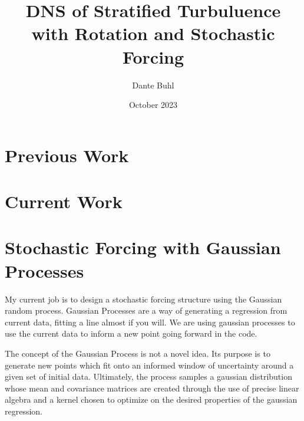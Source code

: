 \documentclass{article}
\title{DNS of Stratified Turbuluence with Rotation and Stochastic Forcing}
\author{Dante Buhl}
\date{October 2023}
\begin{document}
\newcommand{\bs}[1]{\boldsymbol{#1}}
\newcommand{\bmp}[1]{\begin{minipage}{#1\textwidth}}
\newcommand{\emp}{\end{minipage}}
\newcommand{\R}{\mathbb{R}}
\newcommand{\N}{\mathcal{N}}
\newcommand{\K}{\bs{\mathrm{K}}}
\newcommand{\m}{\bs{\mu}_*}
\newcommand{\s}{\bs{\Sigma}_*}
\newcommand{\dt}{\Delta t}

\maketitle

\section{Previous Work}


\section{Current Work}


\section{Stochastic Forcing with Gaussian Processes}
\begin{comment}
 \left[\begin{array}{c c c c c}
    0 & \cdots & 0& \cdots& 0 \\
    \vdots & 0 & 0 & \cdots & 0 \\
    0 & 0 & \lambda_{n_c} & 0 & \vdots \\
    \vdots & \vdots & 0 & \ddots & 0 \\
    0 & 0 & \cdots & 0 & \lambda_{n}
    \end{array}\right]    
\end{comment}

My current job is to design a stochastic forcing structure using the Gaussian random process. Gaussian Processes are a way of generating a regression from current data, fitting a line almost if you will. We are using gaussian processes to use the current data to inform a new point going forward in the code. 

The concept of the Gaussian Process is not a novel idea. Its purpose is to generate new points which fit onto an informed window of uncertainty around a given set of initial data. Ultimately, the process samples a gaussian distribution whose mean and covariance matrices are created through the use of precise linear algebra and a kernel chosen to optimize on the desired properties of the gaussian regression. 
\end{document}
